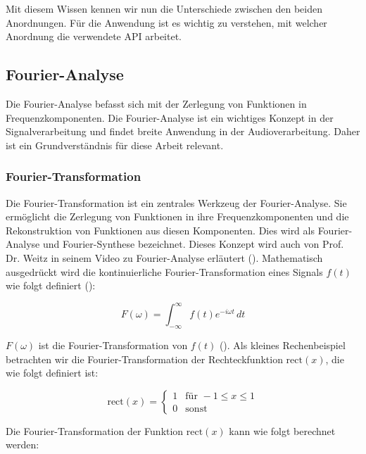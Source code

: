 \documentclass[11pt,a4paper]{article}
\begin{document}
\noindent
Mit diesem Wissen kennen wir nun die Unterschiede zwischen den beiden Anordnungen. Für die 
Anwendung ist es wichtig zu verstehen, mit welcher Anordnung die verwendete API arbeitet.


\subsection{Fourier-Analyse}
Die Fourier-Analyse befasst sich mit der Zerlegung von Funktionen in Frequenzkomponenten. Die 
Fourier-Analyse ist ein wichtiges Konzept in der Signalverarbeitung und findet breite Anwendung 
in der Audioverarbeitung. Daher ist ein Grundverständnis für diese Arbeit relevant. 

\subsubsection{Fourier-Transformation}
Die Fourier-Transformation ist ein zentrales Werkzeug der Fourier-Analyse. Sie ermöglicht die 
Zerlegung von Funktionen in ihre Frequenzkomponenten und die Rekonstruktion von Funktionen aus 
diesen Komponenten. Dies wird als Fourier-Analyse und Fourier-Synthese bezeichnet. Dieses Konzept 
wird auch von Prof. Dr. Weitz in seinem Video zu Fourier-Analyse erläutert 
(\cite[2:20]{weitz2023fourier}). Mathematisch ausgedrückt wird die kontinuierliche 
Fourier-Transformation eines Signals \( f(t) \) wie folgt definiert 
(\cite[Chapter~5]{hansen2014fourier}): 

\begin{equation*}
F(\omega) = \int_{-\infty}^{\infty} f(t) e^{-i \omega t} \, dt
\label{eq:fourier_transform}
\end{equation*}

\noindent
\(F(\omega)\) ist die Fourier-Transformation von \(f(t)\) 
(\cite[49:27]{weitz2023fourier}). Als kleines Rechenbeispiel betrachten wir die 
Fourier-Transformation der Rechteckfunktion \( \text{rect}(x) \), die wie folgt definiert ist:

\[
\text{rect}(x) = 
\begin{cases} 
1 & \text{für } -1 \leq x \leq 1 \\
0 & \text{sonst}
\end{cases}
\]

\noindent
Die Fourier-Transformation der Funktion \( \text{rect}(x) \) kann wie folgt berechnet werden:
\end{document}
